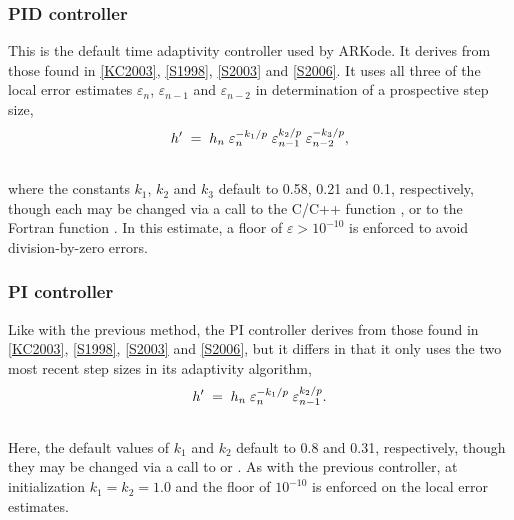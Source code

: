 \documentclass[letterpaper,10pt,english]{sphinxmanual}
\begin{document}
\subsubsection{PID controller}
\label{Mathematics:mathematics-adaptivity-errorcontrol-pid}\label{Mathematics:pid-controller}
This is the default time adaptivity controller used by ARKode.  It
derives from those found in {\hyperref[References:kc2003]{{[}KC2003{]}}}, {\hyperref[References:s1998]{{[}S1998{]}}}, {\hyperref[References:s2003]{{[}S2003{]}}} and
{\hyperref[References:s2006]{{[}S2006{]}}}.  It uses all three of the local error estimates
$\varepsilon_n$, $\varepsilon_{n-1}$ and
$\varepsilon_{n-2}$ in determination of a prospective step size,
\begin{gather}
\begin{split}h' \;=\; h_n\; \varepsilon_n^{-k_1/p}\; \varepsilon_{n-1}^{k_2/p}\;
     \varepsilon_{n-2}^{-k_3/p},\end{split}\notag\\\begin{split}\end{split}\notag
\end{gather}
where the constants $k_1$, $k_2$ and $k_3$ default
to 0.58, 0.21 and 0.1, respectively, though each may be changed via a
call to the C/C++ function {\hyperref[c_interface/User_callable:ARKodeSetAdaptivityMethod]{}}, or
to the Fortran function {\hyperref[f_interface/Usage:f/_/FARKSETADAPTIVITYMETHOD]{}}.  In this
estimate, a floor of $\varepsilon > 10^{-10}$ is enforced to
avoid division-by-zero errors.


\subsubsection{PI controller}
\label{Mathematics:pi-controller}\label{Mathematics:mathematics-adaptivity-errorcontrol-pi}
Like with the previous method, the PI controller derives from those
found in {\hyperref[References:kc2003]{{[}KC2003{]}}}, {\hyperref[References:s1998]{{[}S1998{]}}}, {\hyperref[References:s2003]{{[}S2003{]}}} and {\hyperref[References:s2006]{{[}S2006{]}}}, but it differs in
that it only uses the two most recent step sizes in its adaptivity
algorithm,
\begin{gather}
\begin{split}h' \;=\; h_n\; \varepsilon_n^{-k_1/p}\; \varepsilon_{n-1}^{k_2/p}.\end{split}\notag\\\begin{split}\end{split}\notag
\end{gather}
Here, the default values of $k_1$ and $k_2$ default
to 0.8 and 0.31, respectively, though they may be changed via a
call to {\hyperref[c_interface/User_callable:ARKodeSetAdaptivityMethod]{}} or
{\hyperref[f_interface/Usage:f/_/FARKSETADAPTIVITYMETHOD]{}}.  As with the previous controller,
at initialization $k_1 = k_2 = 1.0$ and the floor of
$10^{-10}$ is enforced on the local error estimates.
\end{document}

